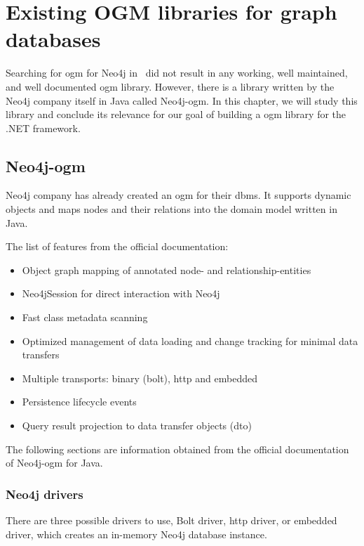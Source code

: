 \chapter {Existing OGM libraries for graph databases}

Searching for \acrshort{ogm} for Neo4j in \CS\ did not result in any working, well maintained, and well documented \acrshort{ogm} library.
However, there is a library written by the Neo4j company itself in Java called Neo4j-\acrshort{ogm}.
In this chapter, we will study this library and conclude its relevance for our goal of building a \acrshort{ogm} library for the .NET framework.

\section{Neo4j-\acrshort{ogm}}

Neo4j company has already created an \acrshort{ogm} for their \acrshort{dbms}.
It supports dynamic objects and maps nodes and their relations into the domain model written in Java.

The list of features from the official documentation: \cite{noauthor_neo4j_nodate-1}
\begin{itemize}
    \item Object graph mapping of annotated node- and relationship-entities
    \item Neo4jSession for direct interaction with Neo4j
    \item Fast class metadata scanning
    \item Optimized management of data loading and change tracking for minimal data transfers
    \item Multiple transports: binary (bolt), \acrshort{http} and embedded
    \item Persistence lifecycle events
    \item Query result projection to data transfer objects (\acrshort{dto})
\end{itemize}

The following sections are information obtained from the official documentation of Neo4j-\acrshort{ogm} for Java. \cite{noauthor_reference_nodate}

\subsection {Neo4j drivers}

There are three possible drivers to use, Bolt driver, \acrshort{http} driver, or embedded driver, which creates an in-memory Neo4j database instance.

